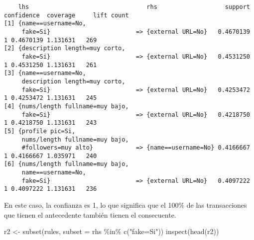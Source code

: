 \documentclass[
  letterpaper,
  DIV=11,
  numbers=noendperiod]{scrreprt}
\newenvironment{Shaded}{\begin{snugshade}}{\end{snugshade}}
\newcommand{\AttributeTok}[1]{\textcolor[rgb]{0.40,0.45,0.13}{#1}}
\newcommand{\FunctionTok}[1]{\textcolor[rgb]{0.28,0.35,0.67}{#1}}
\newcommand{\NormalTok}[1]{\textcolor[rgb]{0.00,0.23,0.31}{#1}}
\newcommand{\OtherTok}[1]{\textcolor[rgb]{0.00,0.23,0.31}{#1}}
\newcommand{\SpecialCharTok}[1]{\textcolor[rgb]{0.37,0.37,0.37}{#1}}
\newcommand{\StringTok}[1]{\textcolor[rgb]{0.13,0.47,0.30}{#1}}
\begin{document}
\begin{verbatim}
    lhs                                 rhs                   support confidence  coverage     lift count
[1] {name==username=No,                                                                                  
     fake=Si}                        => {external URL=No}   0.4670139          1 0.4670139 1.131631   269
[2] {description length=muy corto,                                                                       
     fake=Si}                        => {external URL=No}   0.4531250          1 0.4531250 1.131631   261
[3] {name==username=No,                                                                                  
     description length=muy corto,                                                                       
     fake=Si}                        => {external URL=No}   0.4253472          1 0.4253472 1.131631   245
[4] {nums/length fullname=muy bajo,                                                                      
     fake=Si}                        => {external URL=No}   0.4218750          1 0.4218750 1.131631   243
[5] {profile pic=Si,                                                                                     
     nums/length fullname=muy bajo,                                                                      
     #followers=muy alto}            => {name==username=No} 0.4166667          1 0.4166667 1.035971   240
[6] {nums/length fullname=muy bajo,                                                                      
     name==username=No,                                                                                  
     fake=Si}                        => {external URL=No}   0.4097222          1 0.4097222 1.131631   236
\end{verbatim}

En este caso, la confianza es 1, lo que significa que el 100\% de las
transacciones que tienen el antecedente también tienen el consecuente.

\begin{Shaded}
\begin{Highlighting}[]
\NormalTok{r2 }\OtherTok{\textless{}{-}} \FunctionTok{subset}\NormalTok{(rules, }\AttributeTok{subset =}\NormalTok{ rhs }\SpecialCharTok{\%in\%} \FunctionTok{c}\NormalTok{(}\StringTok{"fake=Si"}\NormalTok{))}
\FunctionTok{inspect}\NormalTok{(}\FunctionTok{head}\NormalTok{(r2))}
\end{Highlighting}
\end{Shaded}
\end{document}
